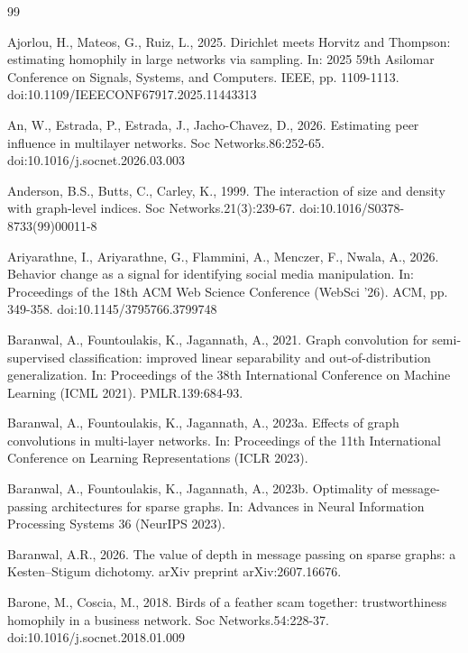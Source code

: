 \documentclass[onecolumn,pdflatex,sn-basic,Numbered]{sn-jnl}
\theoremstyle{thmstyleone}
\theoremstyle{thmstylethree}
\begin{document}
\begin{thebibliography}{99}

Ajorlou, H., Mateos, G., Ruiz, L., 2025. Dirichlet meets Horvitz and Thompson: estimating homophily in large networks via sampling. In: 2025 59th Asilomar Conference on Signals, Systems, and Computers. IEEE, pp. 1109-1113. doi:10.1109/IEEECONF67917.2025.11443313

An, W., Estrada, P., Estrada, J., Jacho-Chavez, D., 2026. Estimating peer influence in multilayer networks. Soc Networks.86:252-65. doi:10.1016/j.socnet.2026.03.003

Anderson, B.S., Butts, C., Carley, K., 1999. The interaction of size and density with graph-level indices. Soc Networks.21(3):239-67. doi:10.1016/S0378-8733(99)00011-8

Ariyarathne, I., Ariyarathne, G., Flammini, A., Menczer, F., Nwala, A., 2026. Behavior change as a signal for identifying social media manipulation. In: Proceedings of the 18th ACM Web Science Conference (WebSci '26). ACM, pp. 349-358. doi:10.1145/3795766.3799748

Baranwal, A., Fountoulakis, K., Jagannath, A., 2021. Graph convolution for semi-supervised classification: improved linear separability and out-of-distribution generalization. In: Proceedings of the 38th International Conference on Machine Learning (ICML 2021). PMLR.139:684-93.

Baranwal, A., Fountoulakis, K., Jagannath, A., 2023a. Effects of graph convolutions in multi-layer networks. In: Proceedings of the 11th International Conference on Learning Representations (ICLR 2023).

Baranwal, A., Fountoulakis, K., Jagannath, A., 2023b. Optimality of message-passing architectures for sparse graphs. In: Advances in Neural Information Processing Systems 36 (NeurIPS 2023).

Baranwal, A.R., 2026. The value of depth in message passing on sparse graphs: a Kesten--Stigum dichotomy. arXiv preprint arXiv:2607.16676.

Barone, M., Coscia, M., 2018. Birds of a feather scam together: trustworthiness homophily in a business network. Soc Networks.54:228-37. doi:10.1016/j.socnet.2018.01.009


\end{thebibliography}
\end{document}
